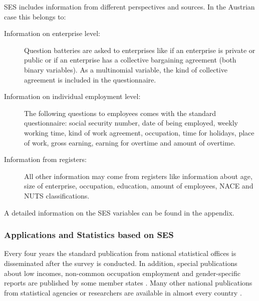 \documentclass[12pt]{article}
\begin{document}
\noindent SES includes information from different perspectives and sources. In
the Austrian case this belongs to:
\begin{description}
\item[Information on enterprise level:]
Question batteries are asked to enterprises like if an
enterprise is private or public or if an enterprise has a collective bargaining
agreement (both binary variables). As a multinomial variable, the kind of
collective agreement is included in the questionnaire.
\item[Information on individual employment level:]
The following questions to employees comes with the standard questionnaire:
social security number, date of being employed, weekly working time,
kind of work agreement, occupation, time for holidays, place of work, gross earning, earning for overtime and amount of overtime.
\item[Information from registers:]  
All other information may come from registers like information about 
age, size of enterprise, occupation, education, amount of employees, NACE and
NUTS classifications.
\end{description}


A detailed information on the SES variables can be found in the appendix.



\subsubsection{Applications and Statistics based on SES}
Every four years the standard publication from national statistical offices is
disseminated after the survey is conducted. In addition, special publications
about low incomes, non-common occupation employment and gender-specific reports are published by some member states \cite[see, e.g.,][]{geissberger10a,geissberger10b}.
Many other national publications from statistical agencies or researchers are
available in almost every country \citep[for some summaries
about publications until 1999,
see][]{Belfield99,Nolan01,Dupray99,frick99,dell00}.
\end{document}
